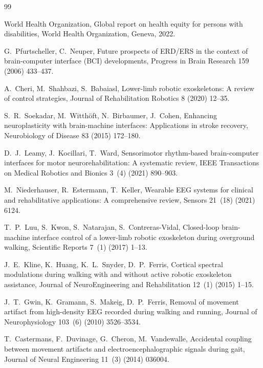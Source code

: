 \documentclass[review,12pt]{elsarticle}
\begin{document}
\begin{thebibliography}{99}

World Health Organization, Global report on health equity for persons with disabilities, World Health Organization, Geneva, 2022.

G.~Pfurtscheller, C.~Neuper, Future prospects of ERD/ERS in the context of brain-computer interface (BCI) developments, Progress in Brain Research 159 (2006) 433--437.

A.~Cheri, M.~Shahbazi, S.~Babaiasl, Lower-limb robotic exoskeletons: A review of control strategies, Journal of Rehabilitation Robotics 8 (2020) 12--35.

S.~R.~Soekadar, M.~Witthöft, N.~Birbaumer, J.~Cohen, Enhancing neuroplasticity with brain-machine interfaces: Applications in stroke recovery, Neurobiology of Disease 83 (2015) 172--180.

D.~J.~Leamy, J.~Kocillari, T.~Ward, Sensorimotor rhythm-based brain-computer interfaces for motor neurorehabilitation: A systematic review, IEEE Transactions on Medical Robotics and Bionics 3~(4) (2021) 890--903.

M.~Niederhauser, R.~Estermann, T.~Keller, Wearable EEG systems for clinical and rehabilitative applications: A comprehensive review, Sensors 21~(18) (2021) 6124.

T.~P.~Luu, S.~Kwon, S.~Natarajan, S.~Contreras-Vidal, Closed-loop brain-machine interface control of a lower-limb robotic exoskeleton during overground walking, Scientific Reports 7~(1) (2017) 1--13.

J.~E.~Kline, K.~Huang, K.~L.~Snyder, D.~P.~Ferris, Cortical spectral modulations during walking with and without active robotic exoskeleton assistance, Journal of NeuroEngineering and Rehabilitation 12~(1) (2015) 1--15.

J.~T.~Gwin, K.~Gramann, S.~Makeig, D.~P.~Ferris, Removal of movement artifact from high-density EEG recorded during walking and running, Journal of Neurophysiology 103~(6) (2010) 3526--3534.

T.~Castermans, F.~Duvinage, G.~Cheron, M.~Vandewalle, Accidental coupling between movement artifacts and electroencephalographic signals during gait, Journal of Neural Engineering 11~(3) (2014) 036004.


\end{thebibliography}
\end{document}

